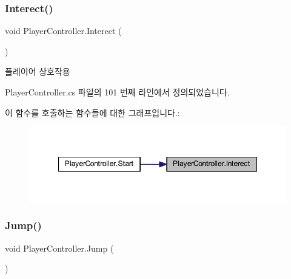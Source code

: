 \subsubsection{\texorpdfstring{Interect()}{Interect()}}
{\footnotesize\ttfamily void Player\+Controller.\+Interect (\begin{DoxyParamCaption}{ }\end{DoxyParamCaption})\hspace{0.3cm}{\ttfamily [inline]}}



플레이어 상호작용 



Player\+Controller.\+cs 파일의 101 번째 라인에서 정의되었습니다.


\begin{DoxyCode}{0}

\end{DoxyCode}
이 함수를 호출하는 함수들에 대한 그래프입니다.\+:
\nopagebreak
\begin{figure}[H]
\begin{center}
\leavevmode
\includegraphics[width=347pt]{dc/dde/class_player_controller_a2af84a2de0a9c5b304d91cc674e76fc1_icgraph}
\end{center}
\end{figure}
\mbox{\label{class_player_controller_a8a7010cb6f3c524737be3f6f77553df9}} 
\subsubsection{\texorpdfstring{Jump()}{Jump()}}
{\footnotesize\ttfamily void Player\+Controller.\+Jump (\begin{DoxyParamCaption}{ }\end{DoxyParamCaption})\hspace{0.3cm}{\ttfamily [inline]}}



